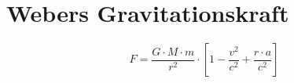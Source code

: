 \section{Webers Gravitationskraft}
\[ F = \frac{G \cdot M \cdot m}{r^2} \cdot \left[1 - \frac{v^2}{c^2} + \frac{r \cdot a}{c^2}\right] \]